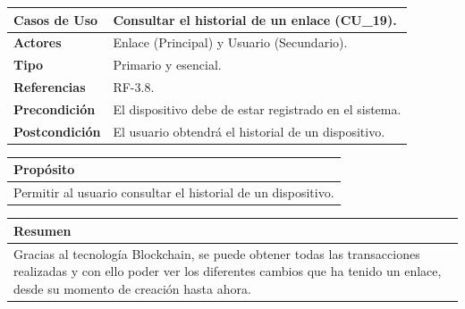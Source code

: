 \begin{itemize}
    \begin{table}[h!]
        \centering
        \begin{tabular}{|l|p{}|}
            \hline
            \textbf{Casos de Uso}   &   Consultar el historial de un enlace (CU\_19). \\
            \hline 
            \textbf{Actores}        &   Enlace (Principal) y Usuario (Secundario). \\ 
            \hline 
            \textbf{Tipo}           &   Primario y esencial. \\ 
            \hline
            \textbf{Referencias}    &   RF-3.8. \\ 
            \hline
            \textbf{Precondición}   &   El dispositivo debe de estar registrado en el sistema. \\ 
            \hline
            \textbf{Postcondición}  &   El usuario obtendrá el historial de un dispositivo. \\ 
            \hline
        \end{tabular}
        
        \vspace{5mm}
        
        \begin{tabular}{|p{\textwidth}|}
            \hline
            \rowcolor{SeaGreen} \textbf{Propósito} \\
            \hline
            \multicolumn{1}{|p{12cm}|}{Permitir al usuario consultar el historial de un dispositivo.} \\ [0.5ex]
            \hline
        \end{tabular}
        
        \vspace{5mm}
        
        \begin{tabular}{|p{\textwidth}|}
            \hline
            \rowcolor{SeaGreen} \textbf{Resumen} \\
            \hline
            \multicolumn{1}{|p{12cm}|}{Gracias al tecnología Blockchain, se puede obtener todas las transacciones
            realizadas y con ello poder ver los diferentes cambios que ha tenido un enlace, desde su momento
            de creación hasta ahora.} \\ [0.5ex]
            \hline
        \end{tabular}
        
        \vspace{5mm}
        

\end{table}
\end{itemize}
